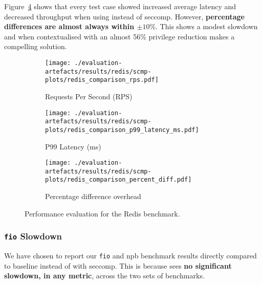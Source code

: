Figure~\ref{fig:redis-perf} shows that every test case showed increased
average latency and decreased throughput when using \af instead of seccomp.
However, \textbf{percentage differences are almost always within $\pm 10\%$}.
This shows a modest slowdown and when contextualised with an almost 56\%
privilege reduction makes \af a compelling solution.

\begin{figure}[htbp]
    \centering
    \begin{subfigure}[b]{\textwidth}
        \centering
        \texttt{[image: ./evaluation-artefacts/results/redis/scmp-plots/redis\_comparison\_rps.pdf]} 
        \caption{Requests Per Second (RPS)}
        \label{fig:redis-rps}
    \end{subfigure}
    \hfill
     \begin{subfigure}[b]{\textwidth}
        \centering
        \texttt{[image: ./evaluation-artefacts/results/redis/scmp-plots/redis\_comparison\_p99\_latency\_ms.pdf]} 
        \caption{P99 Latency (ms)}
        \label{fig:redis-p99}
    \end{subfigure}
    
     \medskip 
     \begin{subfigure}[b]{1.2\textwidth}
        \centering
        \texttt{[image: ./evaluation-artefacts/results/redis/scmp-plots/redis\_comparison\_percent\_diff.pdf]} %
        \caption{Percentage difference overhead}
        \label{fig:redis-percdiff}
    \end{subfigure}

    \caption{Performance evaluation for the Redis benchmark.}
    \label{fig:redis-perf}
\end{figure}

\subsubsection{\texttt{fio} Slowdown}\label{subsubsec:fio-slowdown}

We have chosen to report our \texttt{fio} and \ac{npb} benchmark results directly
compared to baseline instead of with seccomp. This is because \af
sees \textbf{no significant slowdown, in any metric}, across the two sets of
benchmarks. 

